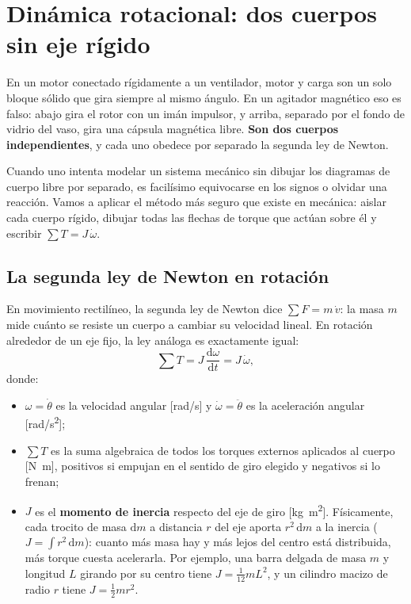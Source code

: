 \documentclass[11pt,a4paper,oneside]{book}
\newcommand{\dd}{\mathrm{d}}
\begin{document}
\chapter{Dinámica rotacional: dos cuerpos sin eje rígido}\label{cap:mecanica}

\begin{ideafisica}
En un motor conectado rígidamente a un ventilador, motor y carga son un solo
bloque sólido que gira siempre al mismo ángulo. En un agitador magnético eso es
falso: abajo gira el rotor con un imán impulsor, y arriba, separado por el fondo
de vidrio del vaso, gira una cápsula magnética libre. \textbf{Son dos cuerpos
independientes}, y cada uno obedece por separado la segunda ley de Newton.
\end{ideafisica}

Cuando uno intenta modelar un sistema mecánico sin dibujar los diagramas de
cuerpo libre por separado, es facilísimo equivocarse en los signos o olvidar una
reacción. Vamos a aplicar el método más seguro que existe en mecánica: aislar
cada cuerpo rígido, dibujar todas las flechas de torque que actúan sobre él y
escribir $\sum T = J\,\dot\omega$.

\section{La segunda ley de Newton en rotación}

En movimiento rectilíneo, la segunda ley de Newton dice $\sum F = m\,\dot v$: la
masa $m$ mide cuánto se resiste un cuerpo a cambiar su velocidad lineal. En
rotación alrededor de un eje fijo, la ley análoga es exactamente igual:
\begin{equation}
  \sum T = J\,\frac{\dd\omega}{\dd t} = J\,\dot\omega,
  \label{eq:newton_rot}
\end{equation}
donde:
\begin{itemize}
  \item $\omega = \dot\theta$ es la velocidad angular [\si{rad/s}] y
        $\dot\omega = \ddot\theta$ es la aceleración angular [\si{rad/s^2}];
  \item $\sum T$ es la suma algebraica de todos los torques externos aplicados
        al cuerpo [\si{N.m}], positivos si empujan en el sentido de giro elegido
        y negativos si lo frenan;
  \item $J$ es el \textbf{momento de inercia} respecto del eje de giro
        [\si{kg.m^2}]. Físicamente, cada trocito de masa $\dd m$ a distancia $r$
        del eje aporta $r^2\,\dd m$ a la inercia ($J = \int r^2\,\dd m$): cuanto
        más masa hay y más lejos del centro está distribuida, más torque cuesta
        acelerarla. Por ejemplo, una barra delgada de masa $m$ y longitud $L$
        girando por su centro tiene $J = \frac{1}{12}m L^2$, y un cilindro
        macizo de radio $r$ tiene $J = \frac{1}{2}m r^2$.
\end{itemize}
\end{document}
